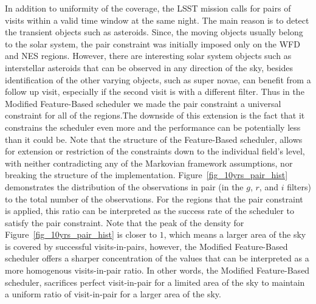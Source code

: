 \documentclass[11pt]{article}
\theoremstyle{definition}
\begin{document}
In addition to uniformity of the coverage, the LSST mission calls for pairs of visits within a valid time window at the same night. The main reason is to detect the transient objects such as asteroids. Since, the moving objects usually belong to the solar system, the pair constraint was initially imposed only on the WFD and NES regions. However, there are interesting solar system objects such as interstellar asteroids that can be observed in any direction of the sky, besides identification of the other varying objects, such as super novae, can benefit from a follow up visit, especially if the second visit is with a different filter. Thus in the Modified Feature-Based scheduler we made the pair constraint a universal constraint for all of the regions.The downside of this extension is the fact that it constrains the scheduler even more and the performance can be potentially less than it could be. Note that the structure of the Feature-Based scheduler, allows for extension or restriction of the constraints down to the individual field's level, with neither contradicting any of the Markovian framework assumptions, nor breaking the structure of the implementation. Figure~\ref{fig_10yrs_pair_hist} demonstrates the distribution of the observations in pair (in the $g$, $r$, and $i$ filters) to the total number of the observations. For the regions that the pair constraint is applied, this ratio can be interpreted as the success rate of the scheduler to satisfy the pair constraint. Note that the peak of the density for Figure~\ref{fig_10yrs_pair_hist} is closer to $1$, which means a larger area of the sky is covered by successful visits-in-pairs, however, the Modified Feature-Based scheduler offers a sharper concentration of the values that can be interpreted as a more homogenous visits-in-pair ratio. In other words, the Modified Feature-Based scheduler, sacrifices perfect visit-in-pair for a limited area of the sky to maintain a uniform ratio of visit-in-pair for a larger area of the sky.\\
\end{document}
